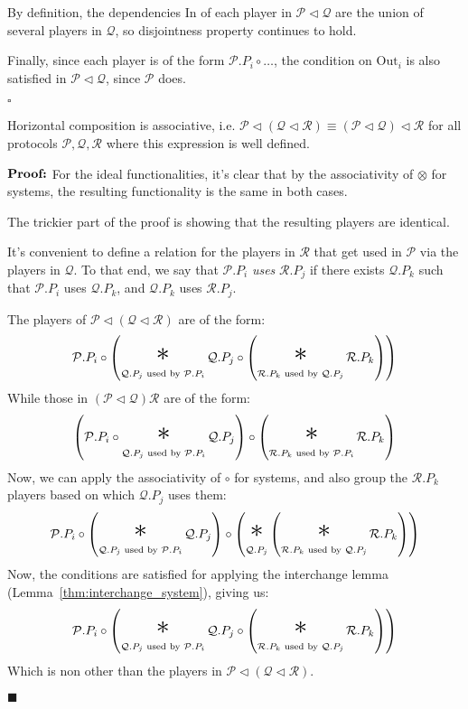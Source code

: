 \begin{definition}
By definition, the dependencies $\text{In}$ of each player in $\mathcal{P} \lhd \mathcal{Q}$
are the union of several players in $\mathcal{Q}$, so disjointness property
continues to hold.

Finally, since each player is of the form $\mathcal{P}.P_i \circ \ldots$,
the condition on $\text{Out}_i$ is also satisfied in $\mathcal{P} \lhd \mathcal{Q}$,
since $\mathcal{P}$ does.

$\square$

\end{definition}

\begin{lemma}
Horizontal composition is associative, i.e.
${\mathcal{P} \lhd (\mathcal{Q} \lhd \mathcal{R}) \equiv (\mathcal{P} \lhd \mathcal{Q}) \lhd \mathcal{R}}$
for all protocols $\mathcal{P}, \mathcal{Q}, \mathcal{R}$ where this expression is well defined.

$\textbf{Proof:}$
For the ideal functionalities, it's clear that by the associativity
of $\otimes$ for systems, the resulting functionality is the same
in both cases.

The trickier part of the proof is showing that the resulting players
are identical.

It's convenient to define a relation for the players in $\mathcal{R}$
that get used in $\mathcal{P}$ via the players in $\mathcal{Q}$.
To that end, we say that $\mathcal{P}.P_i$ \emph{uses} $\mathcal{R}.P_j$
if there exists $\mathcal{Q}.P_k$ such that $\mathcal{P}.P_i$ uses
$\mathcal{Q}.P_k$, and $\mathcal{Q}.P_k$ uses $\mathcal{R}.P_j$.

The players of $\mathcal{P} \lhd (\mathcal{Q} \lhd \mathcal{R})$ are of the form:
$$
  \mathcal{P}.P_i \circ
  \left( \bigast_{\mathcal{Q}.P_j \text{ used by } \mathcal{P}.P_i } 
  \mathcal{Q}.P_j \circ
  \left( \bigast_{\mathcal{R}.P_k \text{ used by } \mathcal{Q}.P_j } \mathcal{R}.P_k
  \right)
  \right)
$$
While those in $(\mathcal{P} \lhd \mathcal{Q}) \mathcal{R}$ are of the form:
$$
  \left( \mathcal{P}.P_i \circ
  \bigast_{\mathcal{Q}.P_j \text{ used by } \mathcal{P}.P_i } 
  \mathcal{Q}.P_j
  \right)
  \circ
  \left(\bigast_{\mathcal{R}.P_k \text{ used by } \mathcal{P}.P_i } \mathcal{R}.P_k
  \right)
$$
Now, we can apply the associativity of $\circ$ for systems, and also
group the $\mathcal{R}.P_k$ players based on which $\mathcal{Q}.P_j$ uses them:
$$
  \mathcal{P}.P_i \circ
  \left(
  \bigast_{\mathcal{Q}.P_j \text{ used by } \mathcal{P}.P_i } 
  \mathcal{Q}.P_j
  \right)
  \circ
  \left(
    \bigast_{\mathcal{Q}.P_j}
  \left(\bigast_{\mathcal{R}.P_k \text{ used by } \mathcal{Q}.P_j } \mathcal{R}.P_k
  \right)
  \right)
$$
Now, the conditions are satisfied for applying the interchange lemma (Lemma~\ref{thm:interchange_system}),
giving us:
$$
  \mathcal{P}.P_i \circ
  \left( \bigast_{\mathcal{Q}.P_j \text{ used by } \mathcal{P}.P_i } 
  \mathcal{Q}.P_j \circ
  \left( \bigast_{\mathcal{R}.P_k \text{ used by } \mathcal{Q}.P_j } \mathcal{R}.P_k
  \right)
  \right)
$$
Which is non other than the players in $\mathcal{P} \lhd (\mathcal{Q} \lhd \mathcal{R})$.

$\blacksquare$
\end{lemma}

